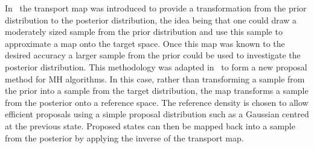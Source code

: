 \documentclass[final]{siamltex}
\begin{document}
%

In~\cite{el2012bayesian} the transport map was introduced to provide a transformation from the prior
distribution to the posterior distribution, the idea being that one could draw a moderately sized
sample from the prior distribution and use this sample to approximate a map onto the target space.
Once this map was known to the desired accuracy a larger sample from the prior could be used to
investigate the posterior distribution. This
methodology was adapted in~\cite{parno2014transport} to form a new proposal method for MH
algorithms. In this case, rather than transforming a sample from the prior into a sample from the target
distribution, the map transforms a sample from the posterior onto a reference space.
The reference density is chosen to allow efficient proposals using a simple proposal
distribution such as a Gaussian centred at the previous state. Proposed states can then be mapped back into a sample from the posterior by applying the inverse of the transport map.
\end{document}
